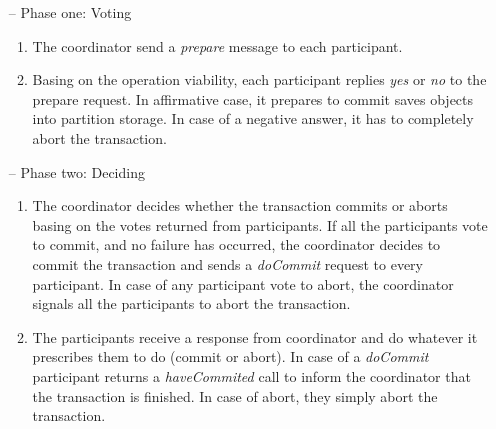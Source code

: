 \documentclass[times, 10pt,twocolumn]{article}
\begin{document}
\begin{itemize}

\item[--] Phase one: Voting

\begin{enumerate}
	
\item The coordinator send a \emph{prepare} message to each participant.

\item Basing on the operation viability, each participant replies \emph{yes} or \emph{no} to the prepare request. In affirmative case, it prepares to commit saves objects into partition storage. In case of a negative answer, it has to completely abort the transaction.

\end{enumerate}

\item[--] Phase two: Deciding

\begin{enumerate}

\item The coordinator decides whether the transaction commits or aborts basing on the votes returned from participants. If all the participants vote to commit, and no failure has occurred, the coordinator decides to commit the transaction and sends a \emph{doCommit} request to every participant. In case of any participant vote to abort, the coordinator signals all the participants to abort the transaction. 

\item The participants receive a response from coordinator and do whatever it prescribes them to do (commit or abort). In case of a \emph{doCommit} participant returns a \emph{haveCommited} call to inform the coordinator that the transaction is finished. In case of abort, they simply abort the transaction.


\end{enumerate}

\end{itemize}
\end{document}
